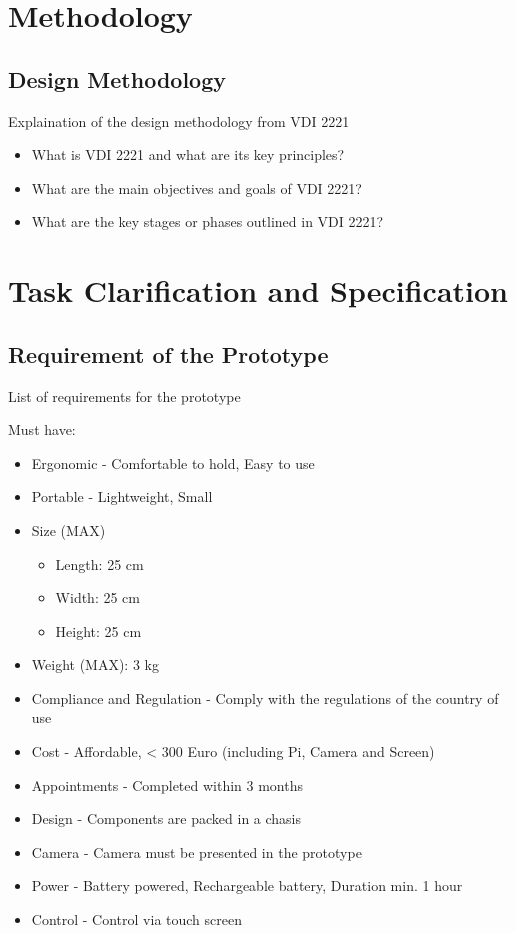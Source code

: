 \chapter{Methodology}

\section{Design Methodology}
Explaination of the design methodology from VDI 2221 \cite{Klaus13}

\begin{itemize}
    \item What is VDI 2221 and what are its key principles?
    \item What are the main objectives and goals of VDI 2221?
    \item What are the key stages or phases outlined in VDI 2221?
\end{itemize}


\chapter{Task Clarification and Specification}
\section{Requirement of the Prototype}
\label{sec:requirement}
List of requirements for the prototype

Must have:
\begin{itemize}
    \item Ergonomic - Comfortable to hold, Easy to use
    \item Portable - Lightweight, Small
    \item Size (MAX)
          \begin{itemize}
              \item Length: 25 cm
              \item Width: 25 cm
              \item Height: 25 cm
          \end{itemize}
    \item Weight (MAX): 3 kg
    \item Compliance and Regulation - Comply with the regulations of the country of use
    \item Cost - Affordable, < 300 Euro (including Pi, Camera and Screen)
    \item Appointments - Completed within 3 months
    \item Design - Components are packed in a chasis
    \item Camera - Camera must be presented in the prototype
    \item Power - Battery powered, Rechargeable battery, Duration min. 1 hour
    \item Control - Control via touch screen
\end{itemize}


